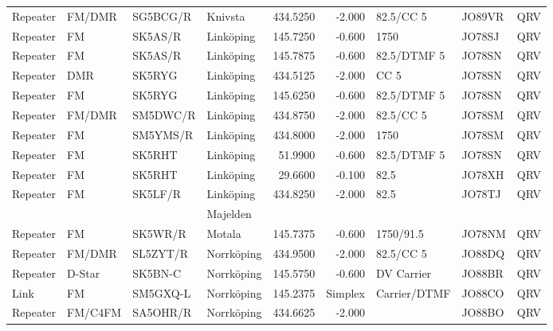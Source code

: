 \begin{longtable}{llllrrlll}
Repeater & FM/DMR     & SG5BCG/R & Knivsta           & 434.5250     & -2.000     & 82.5/CC 5       & JO89VR      & QRV      \\
Repeater & FM         & SK5AS/R  & Linköping         & 145.7250     & -0.600     & 1750            & JO78SJ      & QRV      \\
Repeater & FM         & SK5AS/R  & Linköping         & 145.7875     & -0.600     & 82.5/DTMF 5     & JO78SN      & QRV      \\
Repeater & DMR        & SK5RYG   & Linköping         & 434.5125     & -2.000     & CC 5            & JO78SN      & QRV      \\
Repeater & FM         & SK5RYG   & Linköping         & 145.6250     & -0.600     & 82.5/DTMF 5     & JO78SN      & QRV      \\
Repeater & FM/DMR     & SM5DWC/R & Linköping         & 434.8750     & -2.000     & 82.5/CC 5       & JO78SM      & QRV      \\
Repeater & FM         & SM5YMS/R & Linköping         & 434.8000     & -2.000     & 1750            & JO78SM      & QRV      \\
Repeater & FM         & SK5RHT   & Linköping         & 51.9900      & -0.600     & 82.5/DTMF 5     & JO78SN      & QRV      \\
Repeater & FM         & SK5RHT   & Linköping         & 29.6600      & -0.100     & 82.5            & JO78XH      & QRV      \\
Repeater & FM         & SK5LF/R  & Linköping         & 434.8250     & -2.000     & 82.5            & JO78TJ      & QRV      \\
         &            &          & Majelden          &              &            &                 &             &          \\
Repeater & FM         & SK5WR/R  & Motala            & 145.7375     & -0.600     & 1750/91.5       & JO78NM      & QRV      \\
Repeater & FM/DMR     & SL5ZYT/R & Norrköping        & 434.9500     & -2.000     & 82.5/CC 5       & JO88DQ      & QRV      \\
Repeater & D-Star     & SK5BN-C  & Norrköping        & 145.5750     & -0.600     & DV Carrier      & JO88BR      & QRV      \\
Link     & FM         & SM5GXQ-L & Norrköping        & 145.2375     & Simplex    & Carrier/DTMF    & JO88CO      & QRV      \\
Repeater & FM/C4FM    & SA5OHR/R & Norrköping        & 434.6625     & -2.000     &                 & JO88BO      & QRV      \\

\end{longtable}
